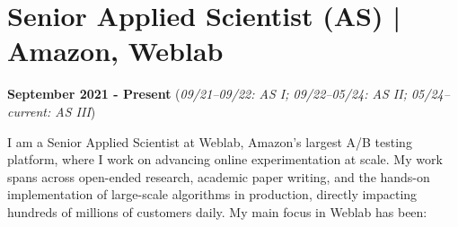 \documentclass[10pt, a4paper]{article}
\begin{document}

\section*{Senior Applied Scientist (AS) | Amazon, Weblab}
\textbf{September 2021 - Present} (\emph{09/21--09/22: AS I; 09/22--05/24: AS II; 05/24--current: AS III})

I am a Senior Applied Scientist at Weblab, Amazon’s largest A/B testing platform, where I work on advancing online experimentation at scale. My work spans across open-ended research, academic paper writing, and the hands-on implementation of large-scale algorithms in production, directly impacting hundreds of millions of customers daily. My main focus in Weblab has been:
\end{document}
